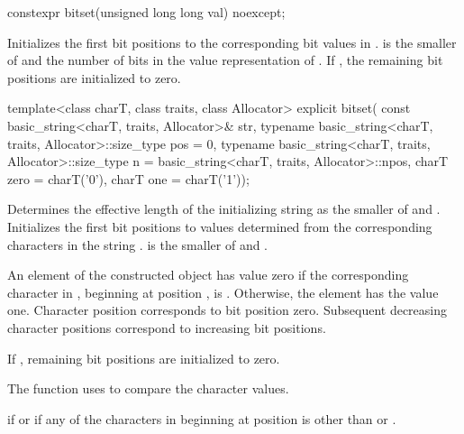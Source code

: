 %
\begin{itemdecl}
constexpr bitset(unsigned long long val) noexcept;
\end{itemdecl}

\begin{itemdescr}
\pnum
\effects
Initializes the first  bit positions to the corresponding bit
values in .
 is the smaller of  and the number of bits in the value
representation of .
If , the remaining bit positions are initialized to zero.
\end{itemdescr}

%
\begin{itemdecl}
template<class charT, class traits, class Allocator>
  explicit bitset(
    const basic_string<charT, traits, Allocator>& str,
    typename basic_string<charT, traits, Allocator>::size_type pos = 0,
    typename basic_string<charT, traits, Allocator>::size_type n
      = basic_string<charT, traits, Allocator>::npos,
    charT zero = charT('0'),
    charT one = charT('1'));
\end{itemdecl}

\begin{itemdescr}
\pnum
\effects
Determines the effective length
 of the initializing string as the smaller of
 and
.
Initializes the first  bit
positions to values determined from the corresponding characters in the string
.
 is the smaller of  and .

\pnum
An element of the constructed object has value zero if the
corresponding character in , beginning at position
, is
.
Otherwise, the element has the value one.
Character position  corresponds to bit position zero.
Subsequent decreasing character positions correspond to increasing bit positions.

\pnum
If , remaining bit positions are initialized to zero.

\pnum
The function uses 
to compare the character values.

\pnum
\throws
{}%
 if  or
%
 if any of
the  characters in 
beginning at position 
is other than  or .
\end{itemdescr}

